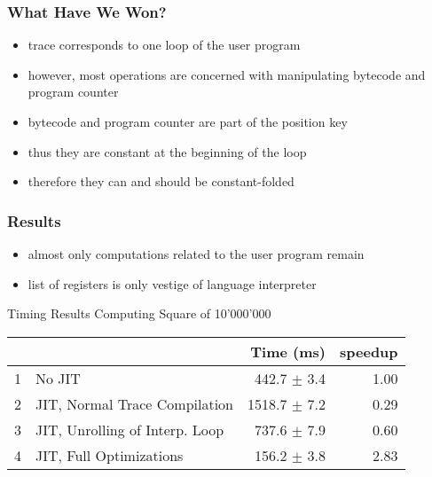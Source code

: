 \documentclass[utf8x]{beamer}
\begin{document}
\begin{frame}
    \frametitle{What Have We Won?}
    \begin{itemize}
    \item trace corresponds to one loop of the user program
    \item however, most operations are concerned with manipulating bytecode and program counter
    \item bytecode and program counter are part of the position key
    \item thus they are constant at the beginning of the loop
    \item therefore they can and should be constant-folded
    \end{itemize}
\end{frame}


\begin{frame}
    \frametitle{Results}
    \begin{itemize}
    \item almost only computations related to the user program remain
    \item list of registers is only vestige of language interpreter
    \end{itemize}
    \pause
    \begin{block}{Timing Results Computing Square of 10'000'000}
    \begin{tabular}{|l|l|r|r|}
\hline
& &Time (ms) &speedup\\
\hline
1 &No JIT &442.7 $\pm$ 3.4 &1.00\\
2 &JIT, Normal Trace Compilation &1518.7 $\pm$ 7.2 &0.29\\
3 &JIT, Unrolling of Interp. Loop &737.6 $\pm$ 7.9 &0.60\\
4 &JIT, Full Optimizations &156.2 $\pm$ 3.8 &2.83\\
\hline
\end{tabular}
\end{block}
\end{frame}
\end{document}
